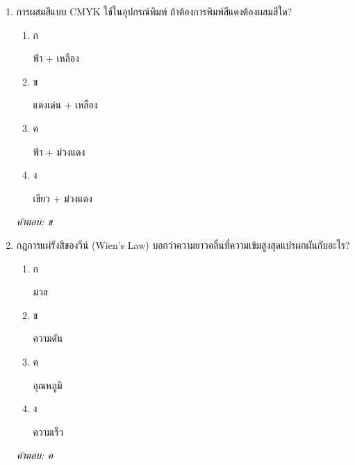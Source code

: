 \documentclass[12pt]{article}
\begin{document}
\begin{enumerate}[label=\arabic*., itemsep=0.5\baselineskip, topsep=0.5\baselineskip, leftmargin=*]
\item การผสมสีแบบ CMYK ใช้ในอุปกรณ์พิมพ์ ถ้าต้องการพิมพ์สีแดงต้องผสมสีใด?
\begin{enumerate}[label=\alph*)., itemsep=0.3\baselineskip, topsep=0.3\baselineskip]
\item ก\ 
\begin{minipage}[t]{0.9\linewidth}
\raggedright ฟ้า + เหลือง
\end{minipage}
\item ข\ 
\begin{minipage}[t]{0.9\linewidth}
\raggedright แดงเด่น + เหลือง
\end{minipage}
\item ค\ 
\begin{minipage}[t]{0.9\linewidth}
\raggedright ฟ้า + ม่วงแดง
\end{minipage}
\item ง\ 
\begin{minipage}[t]{0.9\linewidth}
\raggedright เขียว + ม่วงแดง
\end{minipage}
\end{enumerate}
\vspace{-0.3\baselineskip}
\begin{small}
\textit{คำตอบ: ข}
\end{small}

\item กฎการแผ่รังสีของวีน์ (Wien's Law) บอกว่าความยาวคลื่นที่ความเข้มสูงสุดแปรผกผันกับอะไร?
\begin{enumerate}[label=\alph*)., itemsep=0.3\baselineskip, topsep=0.3\baselineskip]
\item ก\ 
\begin{minipage}[t]{0.9\linewidth}
\raggedright มวล
\end{minipage}
\item ข\ 
\begin{minipage}[t]{0.9\linewidth}
\raggedright ความดัน
\end{minipage}
\item ค\ 
\begin{minipage}[t]{0.9\linewidth}
\raggedright อุณหภูมิ
\end{minipage}
\item ง\ 
\begin{minipage}[t]{0.9\linewidth}
\raggedright ความเร็ว
\end{minipage}
\end{enumerate}
\vspace{-0.3\baselineskip}
\begin{small}
\textit{คำตอบ: ค}
\end{small}


\end{enumerate}
\end{document}
